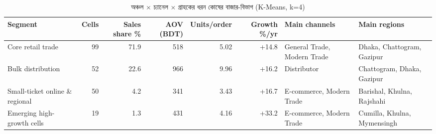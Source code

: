 \begin{table}[htbp]
\centering
\scriptsize
\caption{অঞ্চল $\times$ চ্যানেল $\times$ গ্রাহকের ধরন কোষের বাজার-বিভাগ (K-Means, k=4)}
\label{tab:marketclusters}
\begin{adjustbox}{max width=\linewidth}
\begin{tabular}{lrrrrrll}
\toprule
\textbf{Segment} & \textbf{Cells} & \textbf{Sales share \%} & \textbf{AOV (BDT)} & \textbf{Units/order} & \textbf{Growth \%/yr} & \textbf{Main channels} & \textbf{Main regions} \\
\midrule
Core retail trade & 99 & 71.9 & 518 & 5.02 & +14.8 & General Trade, Modern Trade & Dhaka, Chattogram, Gazipur \\
Bulk distribution & 52 & 22.6 & 966 & 9.96 & +16.2 & Distributor & Chattogram, Dhaka, Gazipur \\
Small-ticket online \& regional & 50 & 4.2 & 341 & 3.43 & +16.7 & E-commerce, Modern Trade & Barishal, Khulna, Rajshahi \\
Emerging high-growth cells & 19 & 1.3 & 431 & 4.16 & +33.2 & E-commerce, Modern Trade & Cumilla, Khulna, Mymensingh \\
\bottomrule
\end{tabular}
\end{adjustbox}
\end{table}
